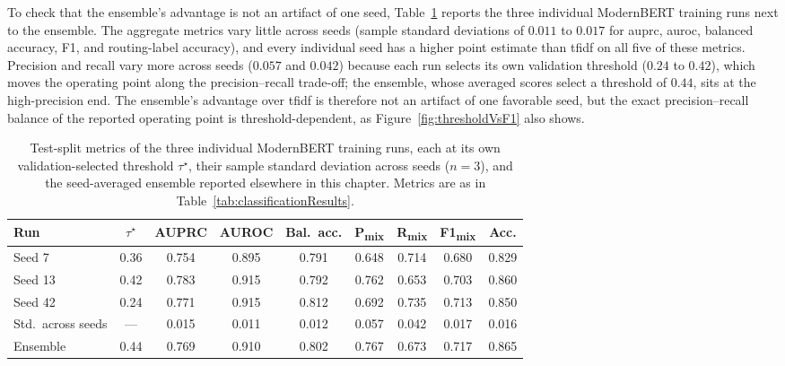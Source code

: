 \documentclass[english, bibtex]{kththesis}               %
\numberwithin{listing}{chapter}
\begin{document}
To check that the ensemble's advantage is not an artifact of one seed, Table~\ref{tab:seedStability} reports the three individual ModernBERT training runs next to the ensemble. The aggregate metrics vary little across seeds (sample standard deviations of $0.011$ to $0.017$ for \gls{auprc}, \gls{auroc}, balanced accuracy, F1, and routing-label accuracy), and every individual seed has a higher point estimate than \gls{tfidf} on all five of these metrics. Precision and recall vary more across seeds ($0.057$ and $0.042$) because each run selects its own validation threshold ($0.24$ to $0.42$), which moves the operating point along the precision--recall trade-off; the ensemble, whose averaged scores select a threshold of $0.44$, sits at the high-precision end. The ensemble's advantage over \gls{tfidf} is therefore not an artifact of one favorable seed, but the exact precision--recall balance of the reported operating point is threshold-dependent, as Figure~\ref{fig:thresholdVsF1} also shows.

\begin{table}[!ht]
\centering
\small
\setlength{\tabcolsep}{3pt}
\renewcommand{\arraystretch}{1.1}
\caption[Test-split metrics of the three individual ModernBERT training runs and the ensemble]{Test-split metrics of the three individual ModernBERT training runs, each at its own validation-selected threshold $\tau^\star$, their sample standard deviation across seeds ($n = 3$), and the seed-averaged ensemble reported elsewhere in this chapter. Metrics are as in Table~\ref{tab:classificationResults}.}
\label{tab:seedStability}
\begin{tabular}{l|c|ccccccc}
\textbf{Run} & $\tau^\star$ & \textbf{AUPRC} & \textbf{AUROC} & \textbf{Bal.\ acc.} & \textbf{P\textsubscript{mix}} & \textbf{R\textsubscript{mix}} & \textbf{F1\textsubscript{mix}} & \textbf{Acc.} \\
\hline
Seed 7  & 0.36 & 0.754 & 0.895 & 0.791 & 0.648 & 0.714 & 0.680 & 0.829 \\
Seed 13 & 0.42 & 0.783 & 0.915 & 0.792 & 0.762 & 0.653 & 0.703 & 0.860 \\
Seed 42 & 0.24 & 0.771 & 0.915 & 0.812 & 0.692 & 0.735 & 0.713 & 0.850 \\
\hline
Std.\ across seeds & --- & 0.015 & 0.011 & 0.012 & 0.057 & 0.042 & 0.017 & 0.016 \\
\hline
Ensemble & 0.44 & 0.769 & 0.910 & 0.802 & 0.767 & 0.673 & 0.717 & 0.865 \\
\end{tabular}
\end{table}
\end{document}
